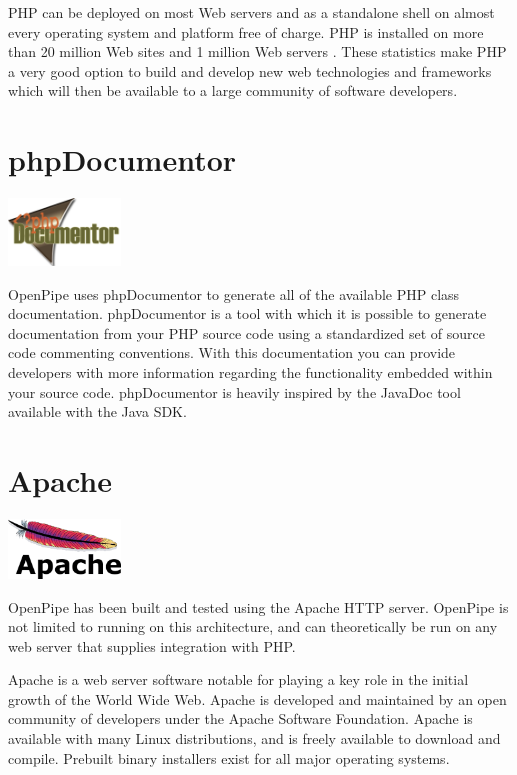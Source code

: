\documentclass[12pt]{report}
\begin{document}
PHP can be deployed on most Web servers and as a standalone shell on almost every operating system and platform free of charge.  PHP is installed on more than 20 million Web sites and 1 million Web servers \cite{phpWiki}. These statistics make PHP a very good option to build and develop new web technologies and frameworks which will then be available to a large community of software developers.


\section{phpDocumentor}
\begin{center} 
\includegraphics[width=30mm]{figures/images/php_documentor_logo.png}
\end{center}

OpenPipe uses phpDocumentor to generate all of the available PHP class documentation. phpDocumentor is a tool with which it is possible to generate documentation from your PHP source code using a standardized set of source code commenting conventions. With this documentation you can provide developers with more information regarding the functionality embedded within your source code. phpDocumentor is heavily inspired by the JavaDoc tool available with the Java SDK. 


\section{Apache}
\begin{center} 
\includegraphics[width=30mm]{figures/images/apache_logo.png}
\end{center}

OpenPipe has been built and tested using the Apache HTTP server. OpenPipe is not limited to running on this architecture, and can theoretically be run on any web server that supplies integration with PHP.

Apache is a web server software notable for playing a key role in the initial growth of the World Wide Web. Apache is developed and maintained by an open community of developers under the Apache Software Foundation. Apache is available with many Linux distributions, and is freely available to download and compile. Prebuilt binary installers exist for all major operating systems.  
\end{document}
